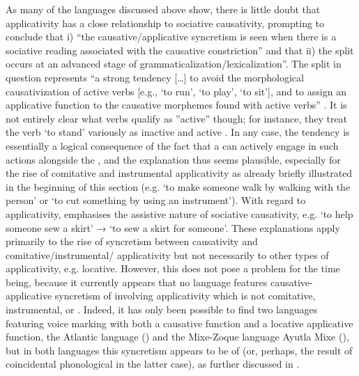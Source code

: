 As many of the languages discussed above show, there is little doubt that applicativity has a close relationship to sociative causativity, prompting \cite[121]{shibatani:pardeshi:2002} to conclude that i) “the causative/applicative syncretism is seen when there is a sociative reading associated with the causative constriction” and that ii) the split occurs at an advanced stage of grammaticalization/lexicalization”. The split in question represents “a strong tendency […] to avoid the morphological causativization of active verbs [e.g., ‘to run’, ‘to play’, ‘to sit’], and to assign an applicative function to the causative morphemes found with active verbs” \citep[118]{shibatani:pardeshi:2002}. It is not entirely clear what verbs qualify as ”active” though; for instance, they treat the verb ‘to stand’ variously as inactive and active \citep[116, 119]{shibatani:pardeshi:2002}. In any case, the tendency is essentially a logical consequence of the fact that a  can actively engage in such actions alongside the , and the explanation thus seems plausible, especially for the rise of comitative and instrumental applicativity as already briefly illustrated in the beginning of this section (e.g. ‘to make someone walk by walking with the person’ or ‘to cut something by using an instrument’). With regard to  applicativity, \cite[11f.]{malchukov:2017} emphasises the assistive nature of sociative causativity, e.g. ‘to help someone sew a skirt’ → ‘to sew a skirt for someone’. These explanations apply primarily to the rise of syncretism between causativity and comitative/instrumental/ applicativity but not necessarily to other types of applicativity, e.g. locative. However, this does not pose a problem for the time being, because it currently appears that no language features causative-applicative syncretism of  involving applicativity which is not comitative, instrumental, or . Indeed, it has only been possible to find two languages featuring voice marking with both a causative function and a locative applicative function, the Atlantic language  () and the Mixe-Zoque language Ayutla Mixe (), but in both languages this syncretism appears to be of  (or, perhaps, the result of coincidental phonological  in the latter case), as further discussed in .

